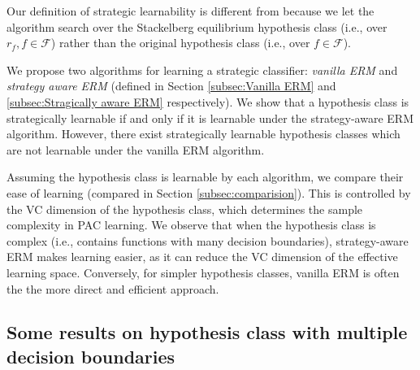 Our definition of strategic learnability is different from \cite{sundaram2021pac} because we let the algorithm search over the Stackelberg equilibrium hypothesis class (i.e., over $r_f, f \in \mathcal{F}$) rather than the original hypothesis class (i.e., over $f \in \mathcal{F}$). 


We propose two algorithms for learning a strategic classifier: \textit{vanilla ERM} and \textit{strategy aware ERM} (defined in Section \ref{subsec:Vanilla ERM} and \ref{subsec:Stragically aware ERM} respectively). We show that a hypothesis class is strategically learnable if and only if it is learnable under the strategy-aware ERM algorithm. 
However, there exist strategically learnable hypothesis classes which are not
learnable under the vanilla ERM algorithm.

Assuming the hypothesis class is learnable by each algorithm, we compare their ease of learning (compared in Section \ref{subsec:comparision}). This is controlled by the VC dimension of the hypothesis class, which determines the sample complexity in PAC learning. We observe that when the hypothesis class is complex (i.e., contains functions with many decision boundaries), strategy-aware ERM makes learning easier, as it can reduce the VC dimension of the effective learning space. Conversely, for simpler hypothesis classes, vanilla ERM is often the the more direct and efficient approach.


\subsection{Some results on hypothesis class with multiple decision boundaries}

